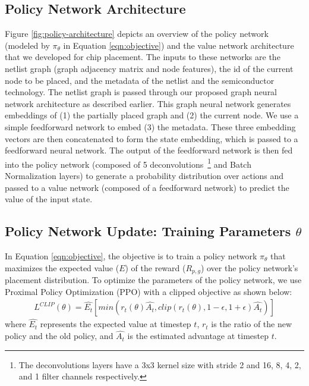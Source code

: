 \documentclass{article}
\begin{document}
\subsection{Policy Network Architecture}
Figure \ref{fig:policy-architecture} depicts an overview of the policy network (modeled by $\pi_{\theta}$ in Equation \ref{eqn:objective}) and the value network architecture that we developed for chip placement. The inputs to these networks are the netlist graph (graph adjacency matrix and node features), the id of the current node to be placed, and the metadata of the netlist and the semiconductor technology. The netlist graph is passed through our proposed graph neural network architecture as described earlier. This graph neural network generates embeddings of (1) the partially placed graph and (2) the current node. We use a simple feedforward network to embed (3) the metadata. These three embedding vectors are then concatenated to form the state embedding, which is passed to a feedforward neural network. The output of the feedforward network is then fed into the policy network (composed of 5 deconvolutions~\footnote{The deconvolutions layers have a 3x3 kernel size with stride 2 and 16, 8, 4, 2, and 1 filter channels respectively.} and Batch Normalization layers) to generate a probability distribution over actions and passed to a value network (composed of a feedforward network) to predict the value of the input state.  


\subsection{Policy Network Update: Training Parameters $\theta$}
\label{section:policy_update}
In Equation \ref{eqn:objective}, the objective is to train a policy network $\pi_{\theta}$ that maximizes the expected value ($E$) of the reward ($R_{p,g}$) over the policy network's placement distribution. To optimize the parameters of the policy network, we use Proximal Policy Optimization (PPO) \cite{ppo17} with a clipped objective as shown below: 
\begin{eqnarray}
  \label{eqn:cost}
  L^{CLIP}(\theta) = {\hat{E_t}}[min(r_t(\theta)\hat{A_t}, clip(r_t(\theta), 1 - \epsilon, 1 + \epsilon)\hat{A_t})]\nonumber
\end{eqnarray}
\vspace{-0.05in}
where $\hat{E_t}$ represents the expected value at timestep $t$, $r_t$ is the ratio of the new policy and the old policy, and $\hat{A_t}$ is the estimated advantage at timestep $t$.
\end{document}
